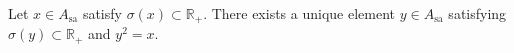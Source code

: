 Let $x \in A_{\mathrm{sa}}$ satisfy $\sigma(x) \subset \mathbb{R}_+$. There exists a unique element $y \in A_{\mathrm{sa}}$ satisfying $\sigma(y) \subset \mathbb{R}_+$ and $y^2 = x$.
